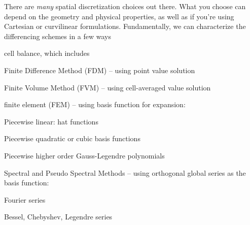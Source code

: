 \documentclass[12pt]{article}
\begin{document}
There are \textit{many} spatial discretization choices out there. What you choose can depend on the geometry and physical properties, as well as if you're using Cartesian or curvilinear formulations. Fundamentally, we can characterize the differencing schemes in a few ways
\begin{compactitem}
\item cell balance, which includes
  \begin{compactitem}
  \item Finite Difference Method (FDM) -- using point value solution	
  \item Finite Volume Method (FVM) -- using cell-averaged value solution
  \end{compactitem}	
\item finite element (FEM) -- using basis function for expansion:	
  \begin{compactitem}
  \item Piecewise linear: hat functions	
  \item Piecewise quadratic or cubic basis functions	
  \item Piecewise higher order Gauss-Legendre polynomials	
  \end{compactitem}
\item Spectral and Pseudo Spectral Methods -- using orthogonal global series as the basis function:	
  \begin{compactitem}
  \item Fourier series	
  \item Bessel, Chebyshev, Legendre series
  \end{compactitem}
\end{compactitem}
\end{document}
